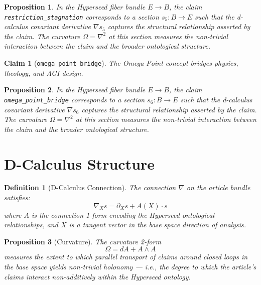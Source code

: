 \documentclass{article}
\newtheorem{claim}{Claim}
\newtheorem{definition}{Definition}
\newtheorem{proposition}{Proposition}
\begin{document}
\begin{proposition}
In the Hyperseed fiber bundle $E \to B$, the claim \texttt{restriction_stagnation} corresponds to a section $s_5: B \to E$ such that the d-calculus covariant derivative $\nabla s_5$ captures the structural relationship asserted by the claim. The curvature $\Omega = \nabla^2$ at this section measures the non-trivial interaction between the claim and the broader ontological structure.
\end{proposition}

\begin{claim}[\texttt{omega_point_bridge}]
The Omega Point concept bridges physics, theology, and AGI design.
\end{claim}

\begin{proposition}
In the Hyperseed fiber bundle $E \to B$, the claim \texttt{omega_point_bridge} corresponds to a section $s_6: B \to E$ such that the d-calculus covariant derivative $\nabla s_6$ captures the structural relationship asserted by the claim. The curvature $\Omega = \nabla^2$ at this section measures the non-trivial interaction between the claim and the broader ontological structure.
\end{proposition}

\section{D-Calculus Structure}

\begin{definition}[D-Calculus Connection]
The connection $\nabla$ on the article bundle satisfies:
\begin{equation}
  \nabla_X s = \partial_X s + A(X) \cdot s
\end{equation}
where $A$ is the connection 1-form encoding the Hyperseed ontological relationships, and $X$ is a tangent vector in the base space direction of analysis.
\end{definition}

\begin{proposition}[Curvature]
The curvature 2-form
\begin{equation}
  \Omega = dA + A \wedge A
\end{equation}
measures the extent to which parallel transport of claims around closed loops in the base space yields non-trivial holonomy --- i.e., the degree to which the article's claims interact non-additively within the Hyperseed ontology.
\end{proposition}
\end{document}

